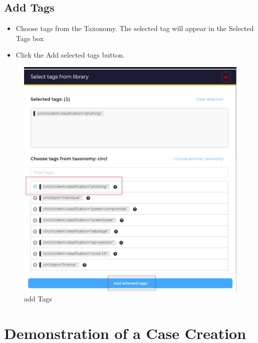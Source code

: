 \documentclass{book}
\begin{document}
\subsection{Add Tags}
\begin{itemize}
    \item Choose tags from the Taxonomy. The selected tag will appear in the Selected Tags box
    \item Click the Add selected tags button.
\end{itemize}
\begin{figure}[h]
    \centering
    \includegraphics[width=.8\linewidth]{Case_images/addTags.png}
    \caption{add Tags}
    \label{fig:addtags}
\end{figure}

\newpage

\section{Demonstration of a Case Creation}
\end{document}
